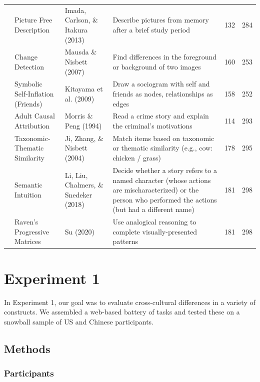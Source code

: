 \documentclass[
  man,floatsintext]{apa6}
\begin{document}
\begin{longtable}{l p{1.2in} p{1.4in} p{1.4in} p{.2in} p{.2in}}
& Picture Free Description & Imada, Carlson, \& Itakura (2013) & Describe pictures from memory after a brief study period &  132 &  284\\

& Change Detection & Mausda \& Nisbett (2007) & Find differences in the foreground or background of two images &  160 &  253\\

& Symbolic Self-Inflation (Friends) & Kitayama et al. (2009) & Draw a sociogram with self and friends as nodes, relationships as edges &  158 &  252\\

& Adult Causal Attribution & Morris \& Peng (1994) & Read a crime story and explain the criminal’s motivations &  114 &  293\\

& Taxonomic-Thematic Similarity & Ji, Zhang, \& Nisbett (2004) & Match items based on taxonomic or thematic similarity (e.g., cow: chicken / grass) & 178 &  295\\

& Semantic Intuition & Li, Liu, Chalmers, \& Snedeker (2018) & Decide whether a story refers to a named character (whose actions are mischaracterized) or the person who performed the actions (but had a different name) &  181 &  298\\

& Raven's Progressive Matrices & Su (2020) & Use analogical reasoning to complete visually-presented patterns &  181 &  298\\
    \hline
    \end{longtable}

\hypertarget{experiment-1}{%
\section{Experiment 1}\label{experiment-1}}

In Experiment 1, our goal was to evaluate cross-cultural differences in a variety of constructs. We assembled a web-based battery of tasks and tested these on a snowball sample of US and Chinese participants.

\hypertarget{methods}{%
\subsection{Methods}\label{methods}}

\hypertarget{participants}{%
\subsubsection{Participants}\label{participants}}
\end{document}
